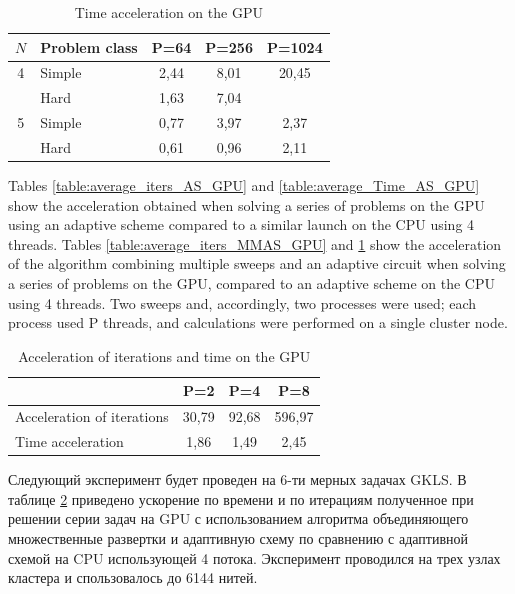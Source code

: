 \documentclass{svproc}
\begin{document}
\begin{table}
    \centering
    \begin{tabular}{|c|p{3cm}|c|c|c|}
    \hline
    \(N\) & Problem class & P=64 & P=256 & P=1024 \\ \hline
    4 & Simple &   2,44 & 8,01 & 20,45  \\ \cline{2-5}
      & Hard   &   1,63 & 7,04 &   \\ \hline
    5 & Simple &   0,77 & 3,97 & 2,37  \\ \cline{2-5}
      & Hard   &   0,61 & 0,96 & 2,11   \\ \hline
    \end{tabular}
    \caption{Time acceleration on the GPU}
    \label{table:average_Time_MMAS_GPU}
\end{table}



Tables \ref{table:average_iters_AS_GPU} and  \ref{table:average_Time_AS_GPU} show the acceleration obtained when solving a series of problems on the GPU using an adaptive scheme compared to a similar launch on the CPU using 4 threads. Tables \ref{table:average_iters_MMAS_GPU} and \ref{table:average_Time_MMAS_GPU} show the acceleration of the algorithm combining multiple sweeps and an adaptive circuit when solving a series of problems on the GPU, compared to an adaptive scheme on the CPU using 4 threads. Two sweeps and, accordingly, two processes were used; each process used P threads, and calculations were performed on a single cluster node.


\begin{table}
    \centering
    \begin{tabular}{|p{4cm}|c|c|c|}
    \hline
      & P=2 & P=4 & P=8 \\ \hline
    Acceleration of iterations&   30,79 & 92,68 & 596,97  \\ \hline
    Time acceleration         &   1,86  & 1,49  & 2,45    \\ \hline

    \end{tabular}
    \caption{Acceleration of iterations and time on the GPU}
    \label{table:GKLS6_average_MMAS_GPU}
\end{table}

Следующий эксперимент будет проведен на 6-ти мерных задачах GKLS. В таблице \ref{table:GKLS6_average_MMAS_GPU} приведено ускорение по времени и по итерациям полученное при решении серии задач на GPU с использованием алгоритма объединяющего множественные развертки и адаптивную схему по сравнению с адаптивной схемой на CPU использующей 4 потока. Эксперимент проводился на трех узлах кластера и спользовалось до 6144 нитей.
\end{document}
